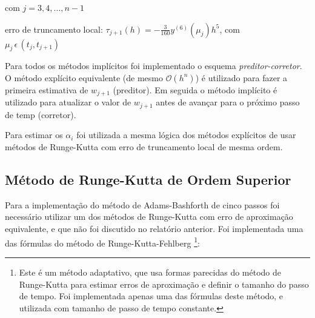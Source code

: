 \documentclass[final,5p]{elsarticle}
\numberwithin{equation}{section}
\begin{document}
        \noindent com $j=3,4,\ldots,n-1$

        \noindent erro de truncamento local: $\tau_{j+1}(h) = -\frac{3}{160}y^{(6)}(\mu_j)h^5$, com \\ $\mu_j \, \epsilon \, (t_j,t_{j+1})$

        Para todos os métodos implícitos foi implementado o esquema \emph{preditor-corretor}. O método explícito equivalente (de mesmo $\mathcal{O}(h^n)$) é utilizado para fazer a primeira estimativa de $w_{j+1}$ (preditor). Em seguida o método implícito é utilizado para atualizar o valor de $w_{j+1}$ antes de avançar para o próximo passo de temp (corretor).

        Para estimar os $\alpha_i$ foi utilizada a mesma lógica dos métodos explícitos de usar métodos de Runge-Kutta com erro de truncamento local de mesma ordem.

    \subsection{Método de Runge-Kutta de Ordem Superior}

        Para a implementação do método de Adams-Bashforth de cinco passos foi necessário utilizar um dos métodos de Runge-Kutta com erro de aproximação equivalente, e que não foi discutido no relatório anterior. Foi implementada uma das fórmulas do método de Runge-Kutta-Fehlberg \cite{burden2016analise}\footnote{Este é um método adaptativo, que usa formas parecidas do método de Runge-Kutta para estimar erros de aproximação e definir o tamanho do passo de tempo. Foi implementada apenas uma das fórmulas deste método, e utilizada com tamanho de passo de tempo constante.}:
\end{document}
